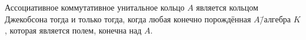 \documentclass[
	extrafontsizes,
	11pt,
	hyphens,
]{memoir}
\begin{document}


\begin{theorem}
Ассоциативное коммутативное унитальное кольцо \(A\) является кольцом Джекобсона\label{thm:GenZarLemma} тогда и только тогда, когда любая конечно порождённая \(A\)\=/алгебра \(K\), которая является полем, конечна над \(A\).
\end{theorem}
\end{document}
